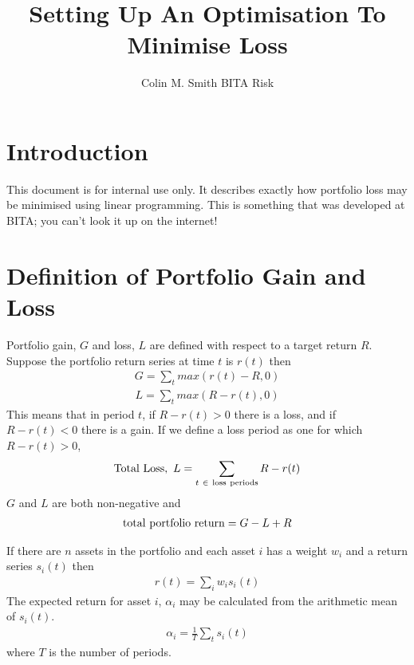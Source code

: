 \documentclass[12pt]{article}
\title{Setting Up An Optimisation To Minimise Loss}
\author{Colin M. Smith BITA Risk}
\begin{document}
\maketitle
\tableofcontents
\pagebreak
\doublespacing
\section{Introduction}
This document is for internal use only. It describes exactly how portfolio loss may be minimised
using linear programming. This is something that was developed at BITA; you can't look it up on the internet!
\section{Definition of Portfolio Gain and Loss}
Portfolio gain, $G$ and loss, $L$ are defined with respect to a target return $R$. Suppose the portfolio return
series at time $t$ is $r(t)$ then
\begin{eqnarray}
    G = \sum_t max(r(t) - R,0)
\end{eqnarray}
\begin{eqnarray}
    L = \sum_t max(R-r(t),0)
\end{eqnarray}
This means that in period $t$, if $R-r(t) > 0$ there is a loss, and if $R-r(t) < 0$ there is a gain.
If we define a loss period as one for which $R-r(t) > 0$,
\begin{eqnarray}
  {\rm Total\ Loss},\ L= \sum_{t\ \in\ \rm loss\ periods} R-r(t)
\end{eqnarray}
$G$ and $L$ are both non-negative and
\begin{eqnarray}
 {\rm   total\ portfolio\ return}= G - L + R
\end{eqnarray}

If there are $n$ assets in the portfolio and each asset $i$
has a weight $w_i$ and a return series $s_i (t)$ then
\begin{eqnarray}
    r(t) = \sum_i w_i s_i(t)
\end{eqnarray}
The expected return for asset $i$, $\alpha_i$ may be calculated from the arithmetic
mean of $s_i(t)$.
\begin{eqnarray}
    \alpha_i = \frac{1} {T} \sum_t s_i(t)
\end{eqnarray}
where $T$ is the number of periods.
\end{document}
